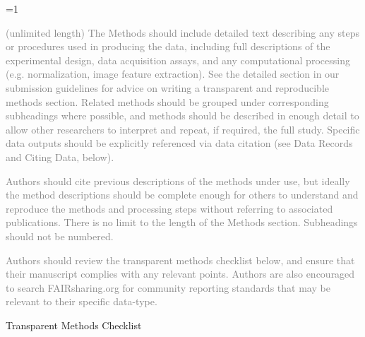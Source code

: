 \documentclass[fleqn,10pt]{wlscirep}
\newcommand{\ifinstruction}{0} %
\begin{document}
\ifnum \ifinstruction=1

\textcolor{gray}{(unlimited length) The Methods should include detailed text describing any steps or procedures used in producing the data, including full descriptions of the experimental design, data acquisition assays, and any computational processing (e.g. normalization, image feature extraction). See the detailed section in our submission guidelines for advice on writing a transparent and reproducible methods section. Related methods should be grouped under corresponding subheadings where possible, and methods should be described in enough detail to allow other researchers to interpret and repeat, if required, the full study. Specific data outputs should be explicitly referenced via data citation (see Data Records and Citing Data, below).}

\textcolor{gray}{Authors should cite previous descriptions of the methods under use, but ideally the method descriptions should be complete enough for others to understand and reproduce the methods and processing steps without referring to associated publications. There is no limit to the length of the Methods section. Subheadings should not be numbered.}

\textcolor{gray}{Authors should review the transparent methods checklist below, and ensure that their manuscript complies with any relevant points. Authors are also encouraged to search FAIRsharing.org for community reporting standards that may be relevant to their specific data-type.}

Transparent Methods Checklist
\end{document}
